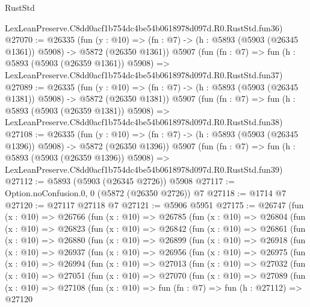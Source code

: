 \begin{lexlean}{RustStd}
\begin{coremodule}
    LexLeanPreserve.C8dd0acf1b754dc4be54b0618978d097d.R0.RustStd.fun36)
@27070 := @26335
    (fun (y : @10) => (fn : @7) -> (h : @5893 (@5903 (@26345 @1361)) @5908) -> @5872 (@26350 @1361))
    @5907
    (fun (fn : @7) =>
    fun (h : @5893 (@5903 (@26359 @1361)) @5908) =>
    LexLeanPreserve.C8dd0acf1b754dc4be54b0618978d097d.R0.RustStd.fun37)
@27089 := @26335
    (fun (y : @10) => (fn : @7) -> (h : @5893 (@5903 (@26345 @1381)) @5908) -> @5872 (@26350 @1381))
    @5907
    (fun (fn : @7) =>
    fun (h : @5893 (@5903 (@26359 @1381)) @5908) =>
    LexLeanPreserve.C8dd0acf1b754dc4be54b0618978d097d.R0.RustStd.fun38)
@27108 := @26335
    (fun (y : @10) => (fn : @7) -> (h : @5893 (@5903 (@26345 @1396)) @5908) -> @5872 (@26350 @1396))
    @5907
    (fun (fn : @7) =>
    fun (h : @5893 (@5903 (@26359 @1396)) @5908) =>
    LexLeanPreserve.C8dd0acf1b754dc4be54b0618978d097d.R0.RustStd.fun39)
@27112 := @5893 (@5903 (@26345 @2726)) @5908
@27117 := Option.noConfusion.{0, 0} (@5872 (@26350 @2726)) @7
@27118 := @1714 @7
@27120 := @27117 @27118 @7
@27121 := @5906 @5951
@27175 := @26747
    (fun (x : @10) =>
    @26766
      (fun (x : @10) =>
      @26785
        (fun (x : @10) =>
        @26804
          (fun (x : @10) =>
          @26823
            (fun (x : @10) =>
            @26842
              (fun (x : @10) =>
              @26861
                (fun (x : @10) =>
                @26880
                  (fun (x : @10) =>
                  @26899
                    (fun (x : @10) =>
                    @26918
                      (fun (x : @10) =>
                      @26937
                        (fun (x : @10) =>
                        @26956
                          (fun (x : @10) =>
                          @26975
                            (fun (x : @10) =>
                            @26994
                              (fun (x : @10) =>
                              @27013
                                (fun (x : @10) =>
                                @27032
                                  (fun (x : @10) =>
                                  @27051
                                    (fun (x : @10) =>
                                    @27070
                                      (fun (x : @10) =>
                                      @27089
                                        (fun (x : @10) =>
                                        @27108
                                          (fun (x : @10) =>
                                          fun (fn : @7) =>
                                          fun (h : @27112) =>
                                          @27120

\end{coremodule}
\end{lexlean}
